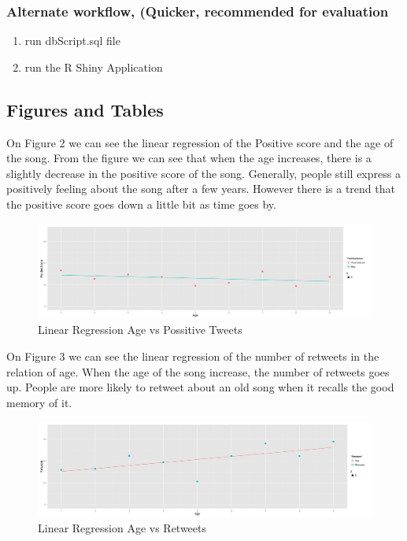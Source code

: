\documentclass{article}
\begin{document}
\subsubsection{Alternate workflow, (Quicker, recommended for evaluation}
\begin{enumerate}
\item run dbScript.sql file
\item run the R Shiny Application
\end{enumerate}


\subsection{Figures and Tables}

On Figure 2 we can see the linear regression of the  Positive score and the age of the song. From the figure we can see that when the age increases, there is a slightly decrease in the positive score of the song. Generally, people still express a positively feeling about the song after a few years. However there is a trend that the positive score goes down a little bit as time goes by.

\begin{figure}[H]
  \centering
  \includegraphics[scale=0.3]{reg_Age_PostitveTweets.png}
  \caption{Linear Regression Age vs Possitive Tweets}
\end{figure}


On Figure 3 we can see the linear regression of the number of retweets in the relation of age. When the age of the song increase, the number of retweets goes up. People are more likely to retweet about an old song when it recalls the good memory of it.

\begin{figure}[H]
  \centering
  \includegraphics[scale=0.3]{reg_Age_Retweets.png}
  \caption{Linear Regression Age vs Retweets}
\end{figure}
\end{document}
